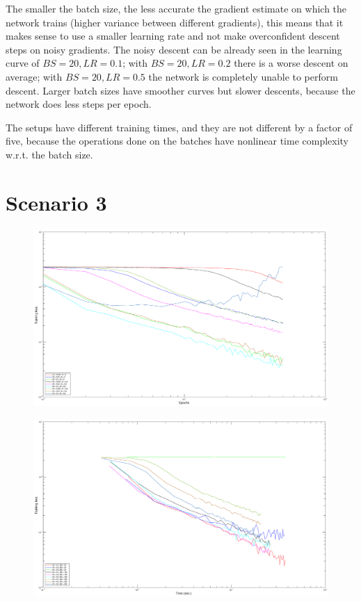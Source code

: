 \documentclass{article}
\begin{document}
    The smaller the batch size, the less accurate the gradient estimate on which the network trains (higher variance between different gradients), this means that it makes sense to use a smaller learning rate
    and not make overconfident descent steps on noisy gradients. The noisy descent can be already seen in the learning curve of $BS = 20, LR = 0.1$; with $BS = 20, LR = 0.2$ there is a worse descent on average; 
    with $BS = 20, LR = 0.5$ the network is completely unable to perform descent. Larger batch sizes have smoother curves but slower descents, because the network does less steps per epoch.
    
    The setups have different training times, and they are not different by a factor of five, because the operations done on the batches have nonlinear time complexity w.r.t. the batch size.
    
    
    
\section*{Scenario 3}
	\begin{figure}[!htb]
        \centering
        \includegraphics[width=\textwidth]{figures/sc3_tr_loss}
    \end{figure}
    \begin{figure}[!htb]
        \centering
        \includegraphics[width=\textwidth]{figures/sc2_tr_loss_time}
    \end{figure}
    
\end{document}
